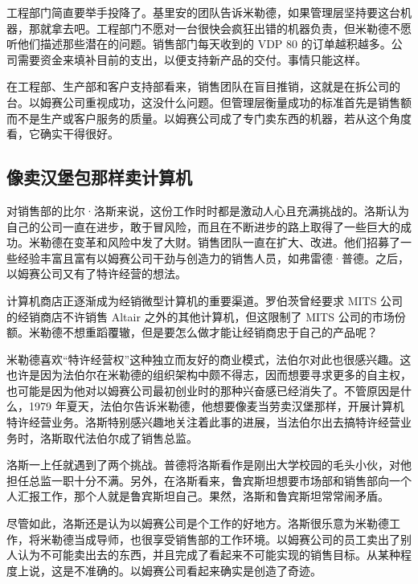 \documentclass[12pt,UTF8]{ctexbook}
\begin{document}
工程部门简直要举手投降了。基里安的团队告诉米勒德，如果管理层坚持要这台机器，那就拿去吧。工程部门不愿对一台很快会疯狂出错的机器负责，但米勒德不愿听他们描述那些潜在的问题。销售部门每天收到的 VDP 80 的订单越积越多。公司需要资金来填补目前的支出，以便支持新产品的交付。事情只能这样。

在工程部、生产部和客户支持部看来，销售团队在盲目推销，这就是在拆公司的台。以姆赛公司重视成功，这没什么问题。但管理层衡量成功的标准首先是销售额而不是生产或客户服务的质量。以姆赛公司成了专门卖东西的机器，若从这个角度看，它确实干得很好。





\subsection{像卖汉堡包那样卖计算机}


对销售部的比尔·洛斯来说，这份工作时时都是激动人心且充满挑战的。洛斯认为自己的公司一直在进步，敢于冒风险，而且在不断进步的路上取得了一些巨大的成功。米勒德在变革和风险中发了大财。销售团队一直在扩大、改进。他们招募了一些经验丰富且富有以姆赛公司干劲与创造力的销售人员，如弗雷德·普德。之后，以姆赛公司又有了特许经营的想法。

计算机商店正逐渐成为经销微型计算机的重要渠道。罗伯茨曾经要求 MITS 公司的经销商店不许销售 Altair 之外的其他计算机，但这限制了 MITS 公司的市场份额。米勒德不想重蹈覆辙，但是要怎么做才能让经销商忠于自己的产品呢？

米勒德喜欢“特许经营权”这种独立而友好的商业模式，法伯尔对此也很感兴趣。这也许是因为法伯尔在米勒德的组织架构中颇不得志，因而想要寻求更多的自主权，也可能是因为他对以姆赛公司最初创业时的那种兴奋感已经消失了。不管原因是什么，1979 年夏天，法伯尔告诉米勒德，他想要像麦当劳卖汉堡那样，开展计算机特许经营业务。洛斯特别感兴趣地关注着此事的进展，当法伯尔出去搞特许经营业务时，洛斯取代法伯尔成了销售总监。

洛斯一上任就遇到了两个挑战。普德将洛斯看作是刚出大学校园的毛头小伙，对他担任总监一职十分不满。另外，在洛斯看来，鲁宾斯坦想要市场部和销售部向一个人汇报工作，那个人就是鲁宾斯坦自己。果然，洛斯和鲁宾斯坦常常闹矛盾。

尽管如此，洛斯还是认为以姆赛公司是个工作的好地方。洛斯很乐意为米勒德工作，将米勒德当成导师，也很享受销售部的工作环境。以姆赛公司的员工卖出了别人认为不可能卖出去的东西，并且完成了看起来不可能实现的销售目标。从某种程度上说，这是不准确的。以姆赛公司看起来确实是创造了奇迹。
\end{document}
